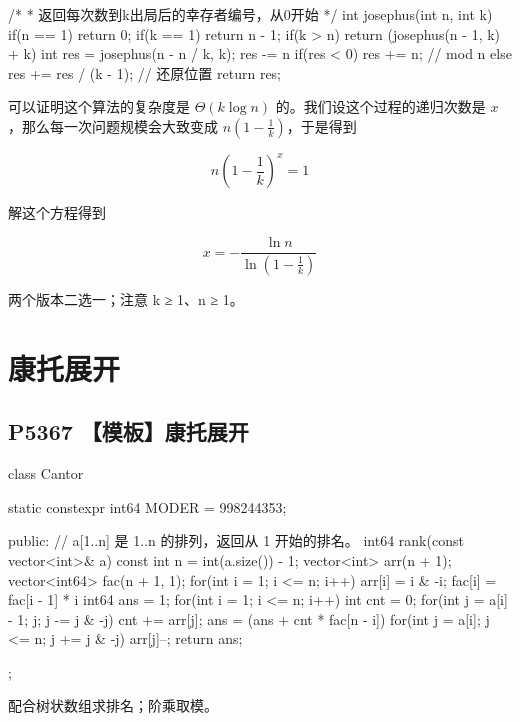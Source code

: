 \begin{codeline}
/*
 * 返回每次数到k出局后的幸存者编号，从0开始
 */
int josephus(int n, int k) {
    if(n == 1) {
        return 0;
    }
    if(k == 1) {
        return n - 1;
    }
    if(k > n) {
        return (josephus(n - 1, k) + k) %
    }
    int res = josephus(n - n / k, k);
    res -= n %
    if(res < 0) {
        res += n; // mod n
    } else {
        res += res / (k - 1); // 还原位置
    }
    return res;
}
\end{codeline}


可以证明这个算法的复杂度是 \(\Theta (k\log n)\) 的。我们设这个过程的递归次数是 \(x\)，那么每一次问题规模会大致变成 \(\displaystyle n\left(1-\frac{1}{k}\right)\)，于是得到

\[
n\left(1-\frac{1}{k}\right)^x=1
\]

解这个方程得到

\[
x=-\frac{\ln n}{\ln\left(1-\frac{1}{k}\right)}
\]

\begin{warnbox}
两个版本二选一；注意 k ≥ 1、n ≥ 1。
\end{warnbox}

\section{康托展开}
\subsection{P5367 【模板】康托展开}\label{p5367-ux6a21ux677fux5eb7ux6258ux5c55ux5f00}










\begin{codeline}
class Cantor {
    static constexpr int64 MODER = 998244353;

public:
    // a[1..n] 是 1..n 的排列，返回从 1 开始的排名。
    int64 rank(const vector<int>& a) const {
        int n = int(a.size()) - 1;
        vector<int> arr(n + 1);
        vector<int64> fac(n + 1, 1);
        for(int i = 1; i <= n; i++) {
            arr[i] = i & -i;
            fac[i] = fac[i - 1] * i %
        }
        int64 ans = 1;
        for(int i = 1; i <= n; i++) {
            int cnt = 0;
            for(int j = a[i] - 1; j; j -= j & -j) {
                cnt += arr[j];
            }
            ans = (ans + cnt * fac[n - i]) %
            for(int j = a[i]; j <= n; j += j & -j) {
                arr[j]--;
            }
        }
        return ans;
    }
};
\end{codeline}
\begin{warnbox}
配合树状数组求排名；阶乘取模。
\end{warnbox}


